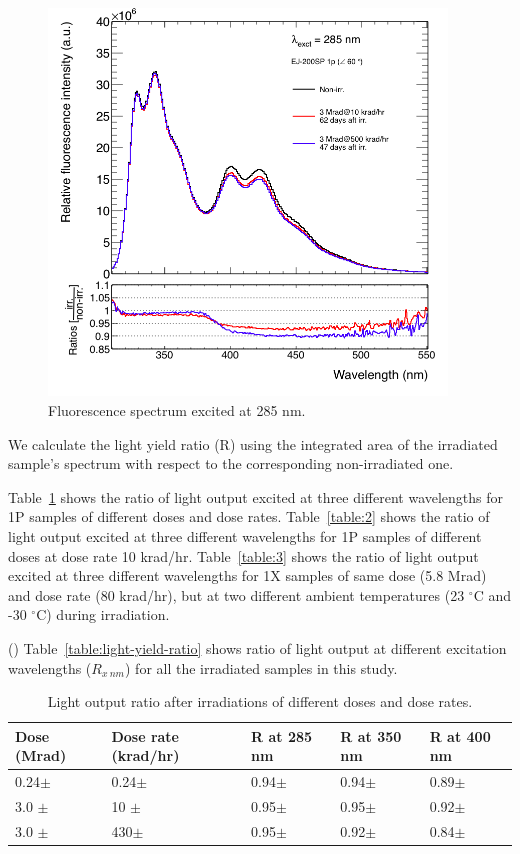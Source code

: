 \documentclass[preprint,12pt]{elsarticle}
\begin{document}
\begin{figure}[!htb]
	\centering
	\includegraphics[width=300pt]{./figures/EJ200SP-1P-exc285.png}
	\caption{Fluorescence spectrum excited at 285 nm.}
	\label{fig:EJ200SP-1P-exc285}
\end{figure}

We calculate the light yield ratio (R) using the integrated area of the irradiated sample's spectrum 
with respect to the corresponding non-irradiated one. 

Table~\ref{table:1} shows the ratio of light output excited at three different wavelengths for 
1P {\color{red}{(1P1X?)}} samples of different doses and dose rates. 
Table~\ref{table:2} shows the ratio of light output excited at three different wavelengths for 
1P {\color{red}{(1P1X?)}} samples of different doses at dose rate 10 krad/hr. 
Table~\ref{table:3} shows the ratio of light output excited at three different wavelengths for 
1X {\color{red}{(1P1X?)}} samples of same dose (5.8 Mrad) and dose rate (80 krad/hr), 
but at two different ambient temperatures (23 $^\circ$C and -30 $^\circ$C) during irradiation. 

({\color{red}{Or should I present all the data in one table?}}) 
Table~\ref{table:light-yield-ratio} shows ratio of light output at different excitation wavelengths ($R_{x~nm}$) 
for all the irradiated samples in this study.

\begin{table}[!ht]
\centering
  \caption{Light output ratio after irradiations of different doses and dose rates.}
  \begin{tabular}{l|l|l|l|l}
    \hline
    Dose (Mrad)  & Dose rate (krad/hr)& R at 285 nm	& R at 350 nm	& R at 400 nm    \\ \hline 
    0.24$\pm$    & 0.24$\pm$ 	      & 0.94$\pm$	& 0.94$\pm$	& 0.89$\pm$   \\ \hline
    3.0 $\pm$    & 10 $\pm$	      & 0.95$\pm$	& 0.95$\pm$	& 0.92$\pm$   \\ \hline
    3.0 $\pm$    & 430$\pm$	      & 0.95$\pm$	& 0.92$\pm$	& 0.84$\pm$   \\ 
    \hline
  \end{tabular}
  \label{table:1}
\end{table}
\end{document}
